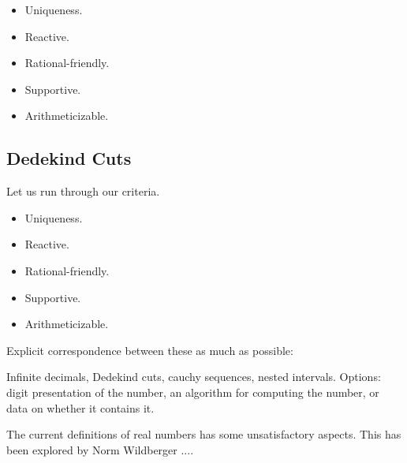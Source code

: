 \documentclass[12pt]{article}
\theoremstyle{remark}
\begin{document}
\begin{itemize}
    \item Uniqueness.
    \item Reactive. 
    \item Rational-friendly. 
    \item Supportive. 
    \item Arithmeticizable. 
\end{itemize}

\subsection{Dedekind Cuts}

Let us run through our criteria. 

\begin{itemize}
    \item Uniqueness.
    \item Reactive. 
    \item Rational-friendly. 
    \item Supportive. 
    \item Arithmeticizable. 
\end{itemize}

Explicit correspondence between these as much as possible: 

Infinite decimals, Dedekind cuts, cauchy sequences, nested intervals. 
Options: digit presentation of the number, an algorithm for computing the number,  or data on whether it contains it. 

The current definitions of real numbers has some unsatisfactory aspects. This
has been explored by Norm Wildberger ....
\end{document}
